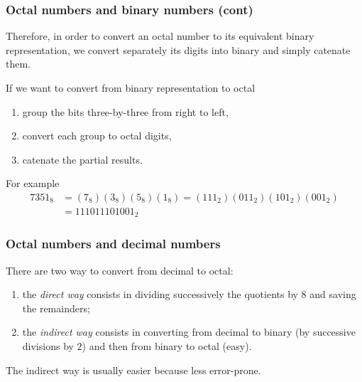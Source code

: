 % 
\begin{frame}
\frametitle{Octal numbers and binary numbers (cont)}

Therefore, in order to convert an octal number to its equivalent
binary representation, we convert separately its digits into binary
and simply catenate them.

\bigskip

If we want to convert from binary representation to octal
\begin{enumerate}

  \item group the bits three-by-three from right to left, 

  \item convert each group to octal digits,

  \item catenate the partial results.

\end{enumerate}
For example
\begin{align*}
7351_8 &= (7_8)(3_8)(5_8)(1_8) = (111_2)(011_2)(101_2)(001_2)\\
       &= 111011101001_2
\end{align*}

\end{frame}

% 
\begin{frame}
\frametitle{Octal numbers and decimal numbers}

There are two way to convert from decimal to octal:
\begin{enumerate}

  \item the \emph{direct way} consists in dividing successively the
    quotients by \(8\) and saving the remainders;

  \item the \emph{indirect way} consists in converting from decimal to
    binary (by successive divisions by \(2\)) and then from binary to
    octal (easy).

\end{enumerate}
The indirect way is usually easier because less error-prone.

\end{frame}

